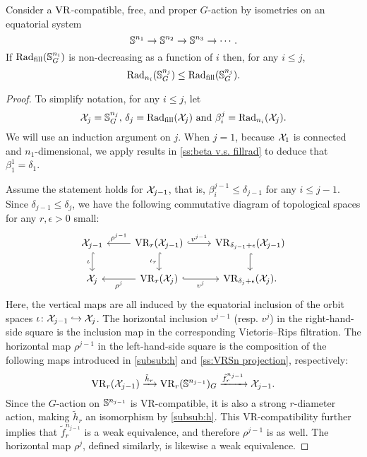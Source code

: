 \subsubsection{}\label{ss:fundamental_lemma}

\medskip\lemma Consider a $\mathrm{VR}$-compatible, free, and proper $G$-action by isometries on an equatorial system
\[
\mathbb{S}^{n_1} \to \mathbb{S}^{n_2} \to \mathbb{S}^{n_3} \to \dotsb.
\]
If $\mathrm{Rad}_{\mathrm{fill}}(\mathbb{S}^{n_i}_G)$ is non-decreasing as a function of \(i\) then, for any \(i \leq j\),
\[
\mathrm{Rad}_{n_i}(\mathbb{S}^{n_j}_G) \leq \mathrm{Rad}_{\mathrm{fill}}(\mathbb{S}^{n_j}_G).
\]

\begin{proof}
    To simplify notation, for any $i \leq j$, let
    \[
        \mathcal{X}_j = \mathbb{S}^{n_j}_G, \,\delta_j = \mathrm{Rad}_{\mathrm{fill}}(\mathcal{X}_j) \text{ and }\beta_i^j = \mathrm{Rad}_{n_i}(\mathcal{X}_j).
    \]
	We will use an induction argument on $j$.
	When $j = 1$, because $\mathcal{X}_1$ is connected and $n_1$-dimensional, we apply results in \cref{ss:beta v.s. fillrad} to deduce that $\beta_1^1 = \delta_1$.

	Assume the statement holds for $\mathcal{X}_{j-1}$, that is, $\beta_i^{j-1} \leq \delta_{j-1}$ for any $i \leq j-1$.
	Since $\delta_{j-1} \leq \delta_j$, we have the following commutative diagram of topological spaces for any $r,\epsilon>0$ small:
    \begin{equation}\label{d:fundamental_bars_diagram}
        \begin{tikzcd}
            \cX_{j-1}
            \ar[d, hook,"{\iota}" left]
            &
            \VR_r(\cX_{j-1})
            \ar[d, hook,"\iota_r" left]
            \ar[l, "\rho^{j-1}" above]
            \ar[r, hook, "v^{j-1}"]
            &
            \VR_{\delta_{j-1}+\epsilon}(\cX_{j-1})
            \ar[d, hook]
            \\
            \cX_j
            &
            \VR_r(\cX_j)
            \ar[l, "\rho^j" below]
            \ar[r, hook, "v^j" below]
            &
            \VR_{\delta_j+\epsilon}(\cX_j).
        \end{tikzcd}
    \end{equation}
    Here, the vertical maps are all induced by the equatorial inclusion of the orbit spaces $\iota \colon \mathcal{X}_{j-1} \hookrightarrow \mathcal{X}_j$.
    The horizontal inclusion $v^{j-1}$ (resp. $v^j$) in the right-hand-side square is the inclusion map in the corresponding Vietoris--Rips filtration.
    The horizontal map $\rho^{j-1}$ in the left-hand-side square is the composition of the following maps introduced in \cref{subsub:h} and \cref{ss:VRSn projection}, respectively:
    \[\mathrm{VR}_r(\mathcal{X}_{j-1}) \xrightarrow{\tilde{h}_r}\mathrm{VR}_r(\mathbb{S}^{n_{j-1}})_G \xrightarrow{\tilde{f}_r^{n_{j-1}}} \mathcal{X}_{j-1}.\]
     Since the \( G \)-action on \( \mathbb{S}^{n_{j-1}} \) is VR-compatible, it is also a strong \( r \)-diameter action, making \( \tilde{h}_r \) an isomorphism by \cref{subsub:h}. 
    This VR-compatibility further implies that \( \tilde{f}_r^{n_{j-1}} \) is a weak equivalence, and therefore \( \rho^{j-1} \) is as well. 
    The horizontal map \( \rho^j \), defined similarly, is likewise a weak equivalence.


\end{proof}
